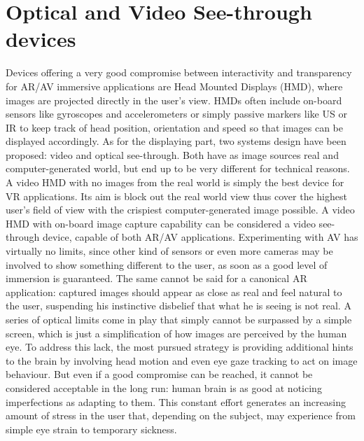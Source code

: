 \section{Optical and Video See-through devices} %
Devices offering a very good compromise between interactivity and transparency for AR/AV immersive applications are Head Mounted Displays (HMD), where images are projected directly in the user's view. HMDs often include on-board sensors like gyroscopes and accelerometers or simply passive markers like US or IR to keep track of head position, orientation and speed so that images can be displayed accordingly. As for the displaying part, two systems design have been proposed: video and optical see-through. Both have as image sources real and computer-generated world, but end up to be very different for technical reasons.\\
A video HMD with no images from the real world is simply the best device for VR applications. Its aim is block out the real world view thus cover the highest user's field of view with the crispiest computer-generated image possible. A video HMD with on-board image capture capability can be considered a video see-through device, capable of both AR/AV applications. Experimenting with AV has virtually no limits, since other kind of sensors or even more cameras may be involved to show something different to the user, as soon as a good level of immersion is guaranteed. The same cannot be said for a canonical AR application: captured images should appear as close as real and feel natural to the user, suspending his instinctive disbelief that what he is seeing is not real. A series of optical limits come in play that simply cannot be surpassed by a simple screen, which is just a simplification of how images are perceived by the human eye. To address this lack, the most pursued strategy is providing additional hints to the brain by involving head motion and even eye gaze tracking to act on image behaviour. But even if a good compromise can be reached, it cannot be considered acceptable in the long run: human brain is as good at noticing imperfections as adapting to them. This constant effort generates an increasing amount of stress in the user that, depending on the subject, may experience from simple eye strain to temporary sickness.\\
